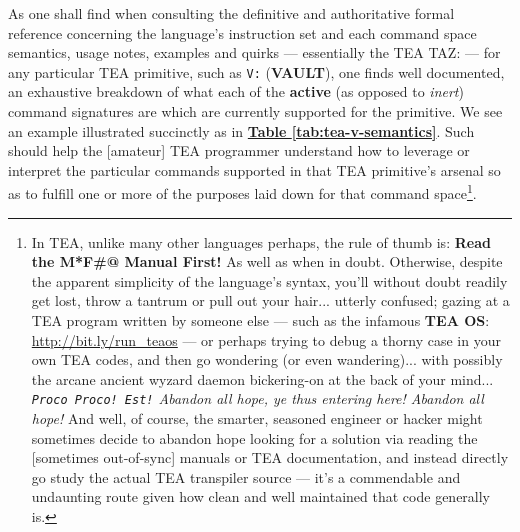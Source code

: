 \documentclass[sigplan,screen]{acmart}
\begin{document}
As one shall find when consulting the definitive and authoritative formal reference concerning the language's instruction set and each command space semantics, usage notes, examples and quirks --- essentially the TEA TAZ: \cite{Lutalo2024TEATAZ} --- for any particular TEA primitive, such as \texttt{V:} (\textbf{VAULT}), one finds well documented, an exhaustive breakdown of what each of the \textbf{active} (as opposed to \textit{inert}) command signatures are which are currently supported for the primitive. We see an example illustrated succinctly as in \textbf{\hyperref[tab:tea-v-semantics]{Table \ref{tab:tea-v-semantics}}}. Such should help the [amateur] TEA programmer understand how to leverage or interpret the particular commands supported in that TEA primitive's arsenal so as to fulfill one or more of the purposes laid down for that command space\footnote{In TEA, unlike many other languages perhaps, the rule of thumb is: \textbf{Read the M*F\#@ Manual First!} As well as when in doubt. Otherwise, despite the apparent simplicity of the language's syntax, you'll without doubt readily get lost, throw a tantrum or pull out your hair... utterly confused; gazing at a TEA program written by someone else --- such as the infamous \textbf{TEA OS}: \url{http://bit.ly/run_teaos} --- or perhaps trying to debug a thorny case in your own TEA codes, and then go wondering (or even wandering)... with possibly the arcane ancient wyzard daemon bickering-on at the back of your mind... \textit{\texttt{Proco Proco! Est!} Abandon all hope, ye thus entering here! Abandon all hope!} And well, of course, the smarter, seasoned engineer or hacker might sometimes decide to abandon hope looking for a solution via reading the [sometimes out-of-sync] manuals or TEA documentation, and instead directly go study the actual TEA transpiler source \cite{cli_tttt} --- it's a commendable and undaunting route given how clean and well maintained that code generally is.}. 
\end{document}
